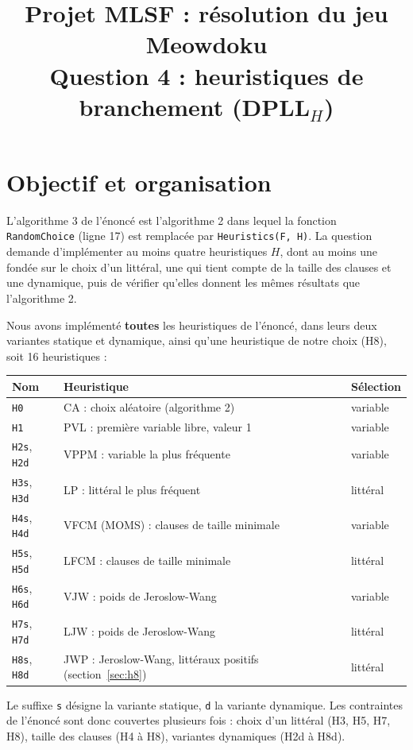 \documentclass[11pt,a4paper]{article}
\title{Projet MLSF : résolution du jeu Meowdoku\\
  \large Question 4 : heuristiques de branchement (DPLL$_H$)}
\author{}
\date{}
\begin{document}
\maketitle

\section{Objectif et organisation}

L'algorithme 3 de l'énoncé est l'algorithme 2 dans lequel la fonction
\texttt{RandomChoice} (ligne 17) est remplacée par \texttt{Heuristics(F, H)}.
La question demande d'implémenter au moins quatre heuristiques $H$, dont au
moins une fondée sur le choix d'un littéral, une qui tient compte de la taille
des clauses et une dynamique, puis de vérifier qu'elles donnent les mêmes
résultats que l'algorithme 2.

Nous avons implémenté \textbf{toutes} les heuristiques de l'énoncé, dans
leurs deux variantes statique et dynamique, ainsi qu'une heuristique de notre
choix (H8), soit 16 heuristiques :
\begin{center}
\begin{tabular}{lll}
  \toprule
  Nom & Heuristique & Sélection \\
  \midrule
  \texttt{H0} & CA : choix aléatoire (algorithme 2) & variable \\
  \texttt{H1} & PVL : première variable libre, valeur 1 & variable \\
  \texttt{H2s}, \texttt{H2d} & VPPM : variable la plus fréquente & variable \\
  \texttt{H3s}, \texttt{H3d} & LP : littéral le plus fréquent & littéral \\
  \texttt{H4s}, \texttt{H4d} & VFCM (MOMS) : clauses de taille minimale & variable \\
  \texttt{H5s}, \texttt{H5d} & LFCM : clauses de taille minimale & littéral \\
  \texttt{H6s}, \texttt{H6d} & VJW : poids de Jeroslow-Wang & variable \\
  \texttt{H7s}, \texttt{H7d} & LJW : poids de Jeroslow-Wang & littéral \\
  \texttt{H8s}, \texttt{H8d} & JWP : Jeroslow-Wang, littéraux positifs
    (section~\ref{sec:h8}) & littéral \\
  \bottomrule
\end{tabular}
\end{center}
Le suffixe \texttt{s} désigne la variante statique, \texttt{d} la variante
dynamique. Les contraintes de l'énoncé sont donc couvertes plusieurs fois :
choix d'un littéral (H3, H5, H7, H8), taille des clauses (H4 à H8),
variantes dynamiques (H2d à H8d).
\end{document}
